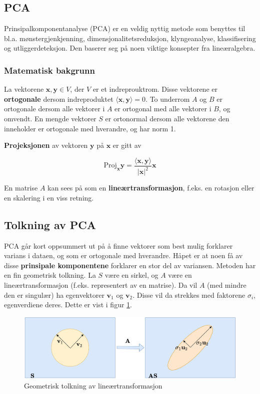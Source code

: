 \subsection{PCA}
Prinsipalkomponentanalyse (PCA) er en veldig nyttig metode som benyttes til bl.a. mønstergjenkjenning, dimensjonalitetsreduksjon, klyngeanalyse, klassifisering og utliggerdeteksjon. Den baserer seg på noen viktige konsepter fra lineæralgebra.

\subsubsection{Matematisk bakgrunn}

La vektorene $\mathbf{x}, \mathbf{y} \in V$, der $V$ er et indreprouktrom. Disse vektorene er \textbf{ortogonale} dersom indreproduktet $\langle \mathbf{x}, \mathbf{y} \rangle = 0$. To underrom $A$ og $B$ er ortogonale dersom alle vektorer i $A$ er ortogonal med alle vektorer i $B$, og omvendt. En mengde vektorer $S$ er ortonormal dersom alle vektorene den inneholder er ortogonale med hverandre, og har norm 1.

\textbf{Projeksjonen} av vektoren $\mathbf{y}$ på $\mathbf{x}$ er gitt av

\begin{equation}
\textrm{Proj}_{\mathbf{x}} \mathbf{y} = \frac{\langle \mathbf{x}, \mathbf{y} \rangle}{|\mathbf{x}|^2}\mathbf{x}
	\label{eq_projection}
\end{equation}

En matrise $A$ kan sees på som en \textbf{lineærtransformasjon}, f.eks. en rotasjon eller en skalering i en viss retning.

\subsection{Tolkning av PCA}
PCA går kort oppsummert ut på å finne vektorer som best mulig forklarer varians i dataen, og som er ortogonale med hverandre. Håpet er at noen få av disse \textbf{prinsipale komponentene} forklarer en stor del av variansen. Metoden har en fin geometrisk tolkning. La $S$ være en sirkel, og $A$ være en lineærtransformasjon (f.eks. representert av en matrise). Da vil $A$ (med mindre den er singulær) ha egenvektorer $\mathbf{v}_1$ og $\mathbf{v}_2$. Disse vil da strekkes med faktorene $\sigma_i$, egenverdiene deres. Dette er vist i figur \ref{fig:pca_skvis}.

\begin{figure}[h]
	\centering
	\includegraphics[width=\textwidth]{figurer/pca_skvis}
	\caption{Geometrisk tolkning av lineærtransformasjon}
	\label{fig:pca_skvis}
\end{figure}

